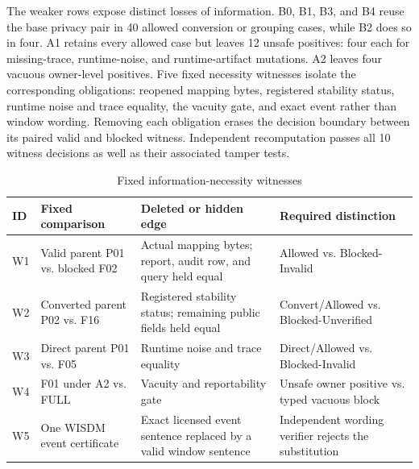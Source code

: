 The weaker rows expose distinct losses of information.  B0, B1, B3, and B4 reuse
the base privacy pair in 40 allowed conversion or grouping cases, while B2 does so
in four.  A1 retains every allowed case but leaves 12 unsafe positives: four each
for missing-trace, runtime-noise, and runtime-artifact mutations.  A2 leaves four
vacuous owner-level positives.  Five fixed necessity witnesses isolate the
corresponding obligations: reopened mapping bytes, registered stability status,
runtime noise and trace equality, the vacuity gate, and exact event rather than
window wording.  Removing each obligation erases the decision boundary between
its paired valid and blocked witness.  Independent recomputation passes all 10
witness decisions as well as their associated tamper tests.

\begin{table}[tbp]
    \centering
    \caption{Fixed information-necessity witnesses}
    \label{tab:ch2-necessity-witnesses}
    \footnotesize
    \setlength{\tabcolsep}{2.8pt}
    \renewcommand{\arraystretch}{1.13}
    \begin{tabular}{@{}
        >{\centering\arraybackslash}p{}
        >{\raggedright\arraybackslash}p{}
        >{\raggedright\arraybackslash}p{}
        >{\raggedright\arraybackslash}p{}@{}}
        \toprule
        \textbf{ID} & \textbf{Fixed comparison} &
        \textbf{Deleted or hidden edge} & \textbf{Required distinction} \\
        \midrule
        W1 & Valid parent P01 vs. blocked F02 &
        Actual mapping bytes; report, audit row, and query held equal &
        \textsf{Allowed} vs. \textsf{Blocked-Invalid} \\

        W2 & Converted parent P02 vs. F16 &
        Registered stability status; remaining public fields held equal &
        \textsf{Convert/Allowed} vs. \textsf{Blocked-Unverified} \\

        W3 & Direct parent P01 vs. F05 &
        Runtime noise and trace equality &
        \textsf{Direct/Allowed} vs. \textsf{Blocked-Invalid} \\

        W4 & F01 under A2 vs. \textsf{FULL} &
        Vacuity and reportability gate &
        Unsafe owner positive vs. typed vacuous block \\

        W5 & One WISDM event certificate &
        Exact licensed event sentence replaced by a valid window sentence &
        Independent wording verifier rejects the substitution \\
        \bottomrule
    \end{tabular}
\end{table}

